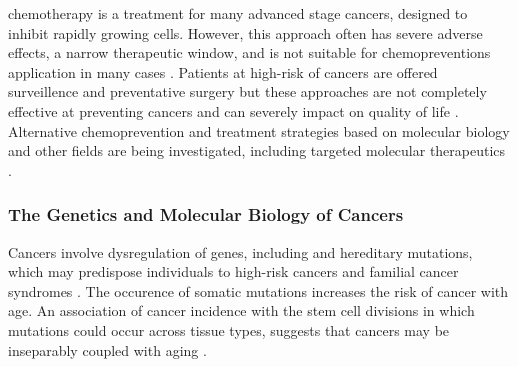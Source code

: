 \Gls{chemotherapy} is a treatment for many advanced stage cancers, designed to inhibit rapidly growing cells. However, this approach often has severe adverse effects, a narrow therapeutic window, and is not suitable for \glspl{chemoprevention} application in many cases \citep{Kaelin2009}. Patients at high-risk of cancers are offered surveillence and preventative surgery but these approaches are not completely effective at preventing cancers and can severely impact on quality of life \citep{Guilford2010}. Alternative \gls{chemoprevention} and treatment strategies based on molecular biology and other fields are being investigated, including targeted molecular therapeutics \citep{Bozovic-Spasojevic2012}. %



\subsubsection{The Genetics and Molecular Biology of Cancers}

Cancers involve dysregulation of genes, including  and \gls{hereditary} \glspl{mutation}, which may predispose individuals to high-risk cancers and \gls{familial} cancer syndromes \citep{NCI2015, ACS2017, Guilford1998, Stratton2009, Vogelstein2013}. 
The occurence of \gls{somatic} \glspl{mutation} increases the risk of \gls{cancer} with age. An association of cancer incidence with the stem cell divisions in which \glspl{mutation} could occur across tissue types, suggests that cancers may be inseparably coupled with aging \citep{Tomasetti2015}.  


